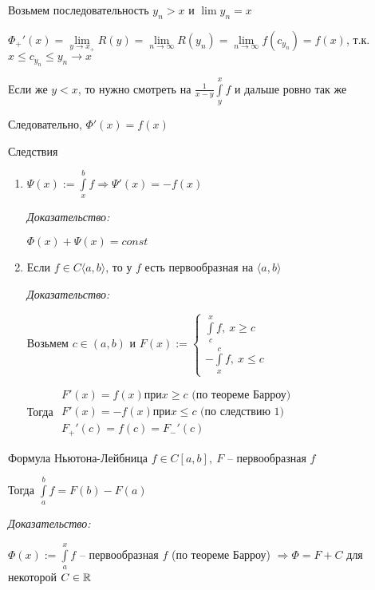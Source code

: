 \documentclass[12pt]{article}
\newcommand{\q}[1]{\langle #1 \rangle}
\begin{document}
Возьмем последовательность $y_n > x$ и $\lim y_n = x$

$\Phi_+'(x) = \lim\limits_{y \to x_+} R(y) = \lim\limits_{n \to \infty} R(y_n) = \lim\limits_{n \to \infty} f(c_{y_n}) = f(x)$, т.к. $x \leq c_{y_n} \leq y_n \rightarrow x$

Если же $y < x$, то нужно смотреть на $\frac{1}{x - y} \int\limits_y^x f$ и дальше ровно так же 

Следовательно, $\Phi'(x) = f(x)$

\begin{theo}{Следствия}
    \begin{enumerate}
        \item $\Psi(x) := \int\limits_x^b f \Rightarrow \Psi'(x) = -f(x)$
        
        \textit{Доказательство:}

        $\Phi(x) + \Psi(x) = const$

        \item Если $f \in C\q{a, b}$, то у $f$ есть первообразная на $\q{a, b}$
        
        \textit{Доказательство:}

        Возьмем $c \in (a, b)$ и $F(x) := \begin{cases}
            \int\limits_c^x f,\ x \geq c \\
            -\int\limits_x^c f,\ x \leq c
        \end{cases}$
        
        Тогда $\begin{gathered}
            F'(x) = f(x) \text{при} x \geq c \text{ (по теореме Барроу)} \\
            F'(x) = -f(x) \text{при} x \leq c \text{ (по следствию 1)} \\
            F_+'(c) = f(c) = F_-'(c)
        \end{gathered}$
    \end{enumerate}
\end{theo}

\begin{theo}{Формула Ньютона-Лейбница}
    $f \in C[a, b],\ F$ -- первообразная $f$

    Тогда $\int\limits_a^b f = F(b) - F(a)$
\end{theo}

\textit{Доказательство:}

$\Phi(x) := \int\limits_a^x f$ -- первообразная $f$ (по теореме Барроу) $\Rightarrow \Phi = F + C$ для некоторой $C \in \mathbb R$
\end{document}
